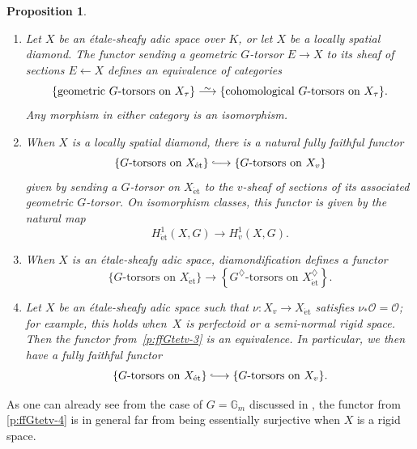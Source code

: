 \documentclass[10pt,a4paper]{article}
\newtheorem{Proposition}[thm]{Proposition}
\theoremstyle{definition}
\theoremstyle{remark}
\newcommand{\lra}{\longrightarrow}
\newcommand*{\lowsim}{\vbox to 0pt{\vss\hbox{$\scriptstyle\sim$}\vskip-2pt}}
\newcommand*{\longisomarrow}{\stackrel{\lowsim}{\lra}}
\newcommand*{\longhookrightarrow}{\lhook\joinrel\longrightarrow}
\newcommand{\G}{\mathbb{G}}
\renewcommand{\O}{\mathcal{O}}
\newcommand{\et}{{\operatorname{\acute{e}t}}}
\numberwithin{equation}{section}
\begin{document}
\begin{Proposition}\label{p:fully-faithful-G-torsors-et-to-v}\leavevmode
	\begin{enumerate}
		\item\label{p:ffGtetv-1} Let $X$  be an \'etale-sheafy adic space over $K$, or let $X$ be a locally spatial diamond.
	The functor sending a geometric $G$-torsor $E\to X$ to its sheaf of sections $E\leftarrow X$ defines an equivalence of categories
	\[\{\text{geometric $G$-torsors on $X_{\tau}$}\}\longisomarrow\{\text{cohomological $G$-torsors on $X_{\tau}$}\}.\]
	Any morphism in either category is an isomorphism.
	\item\label{p:ffGtetv-2} When $X$ is a locally spatial diamond, there is a natural fully faithful functor
	\[ \{\text{$G$-torsors on $X_{\et}$}\}\longhookrightarrow\{\text{$G$-torsors on $X_{v}$}\}\]
	given by sending a $G$-torsor on $X_{\et}$ to the $v$-sheaf of sections of its associated geometric $G$-torsor. On isomorphism classes, this functor is given by the natural map
        \[H^1_{\et}(X,G)\lra H^1_{v}(X,G).\]
	\item\label{p:ffGtetv-3} When $X$ is an \'etale-sheafy adic space, diamondification defines a functor
	\[ \{\text{$G$-torsors on $X_{\et}$}\}\lra\left\{\text{$G^\diamondsuit$-torsors on $X_{\et}^\diamondsuit$}\right\}.\]
	\item\label{p:ffGtetv-4} Let $X$ be an \'etale-sheafy adic space such that $\nu\colon X_v\to X_\et$ satisfies $\nu_{\ast}\O=\O$; for example, this holds when~$X$ is perfectoid or a semi-normal rigid space. Then the functor from~\eqref{p:ffGtetv-3} is an equivalence. In particular, we then have a fully faithful functor
	\[\{\text{$G$-torsors on $X_{\et}$}\}\longhookrightarrow\{\text{$G$-torsors on $X_{v}$}\}.\]
	\end{enumerate}
\end{Proposition}

As one can already see  from the case of $G=\G_m$  discussed in \cite{heuer-v_lb_rigid}, the functor from \eqref{p:ffGtetv-4} is in general far from being essentially surjective when $X$ is a rigid space.
\end{document}

